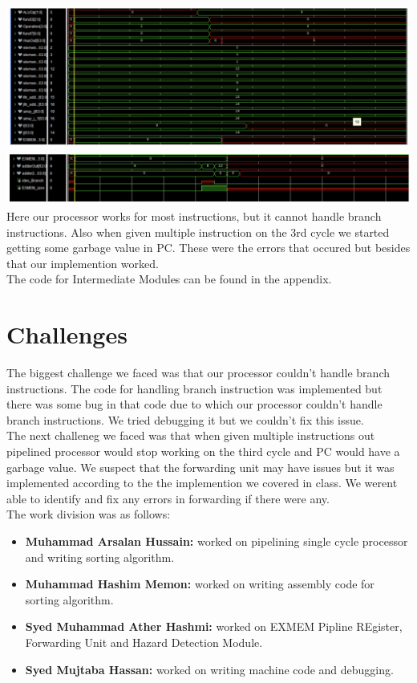 \documentclass[a4paper, 12pt]{report}
\begin{document}
\\\includegraphics[scale = 0.5]{pipe ep 2.png}
\\\includegraphics[scale = 0.5]{pipe ep 3.png}
\\Here our processor works for most instructions, but it cannot handle branch instructions. Also when given multiple instruction on the 3rd cycle we started getting some garbage value in PC.
These were the errors that occured but besides that our implemention worked.
\\The code for Intermediate Modules can be found in the appendix.
\section*{Challenges}
The biggest challenge we faced was that our processor couldn't handle branch instructions. 
The code for handling branch instruction was implemented but there was some bug in that code due to which our processor couldn't handle branch instructions.
We tried debugging it but we couldn't fix this issue.
\\The next challeneg we faced was that when given multiple instructions out pipelined processor would stop working on the third cycle and PC would have a garbage value.
We suspect that the forwarding unit may have issues but it was implemented according to the the implemention we covered in class. We werent able to identify and fix any errors in forwarding if there were any.
\vspace{2cm}
\\The work division was as follows:
\begin{itemize}
    \item \textbf{Muhammad Arsalan Hussain:} worked on pipelining single cycle processor and writing sorting algorithm.
    \item \textbf{Muhammad Hashim Memon:} worked on writing assembly code for sorting algorithm.
    \item \textbf{Syed Muhammad Ather Hashmi:} worked on EXMEM Pipline REgister, Forwarding Unit and Hazard Detection Module.
    \item \textbf{Syed Mujtaba Hassan:} worked on writing machine code and debugging.
\end{itemize}
\end{document}
